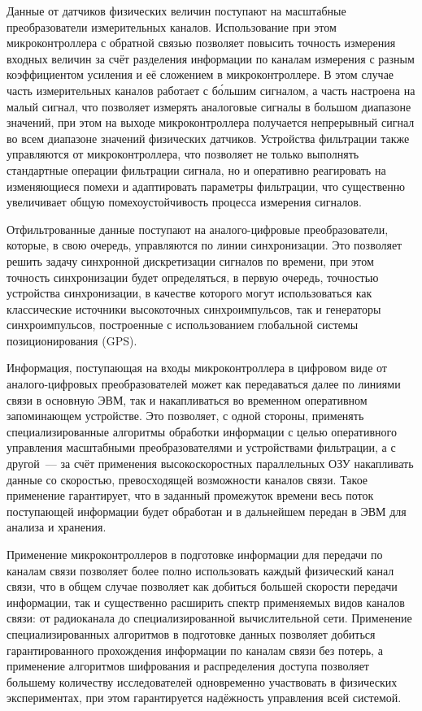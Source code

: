 \documentclass[a4paper, 14pt, titlepage]{extarticle}
\begin{document}
  Данные от датчиков физических величин поступают на масштабные преобразователи измерительных
  каналов. Использование при этом микроконтроллера с обратной связью позволяет повысить точность
  измерения входных величин за счёт разделения информации по каналам
  измерения с разным коэффициентом усиления и её сложением в микроконтроллере. В этом случае часть
  измерительных каналов работает с б\'{о}льшим сигналом, а часть настроена на малый сигнал, что
  позволяет измерять аналоговые сигналы в большом диапазоне значений, при этом на выходе
  микроконтроллера получается непрерывный сигнал во всем диапазоне значений физических датчиков.
  Устройства фильтрации также управляются от микроконтроллера, что позволяет не только выполнять
  стандартные операции фильтрации сигнала, но и оперативно реагировать на изменяющиеся помехи и адаптировать параметры
  фильтрации, что существенно увеличивает общую помехоустойчивость процесса измерения сигналов.

  Отфильтрованные данные поступают на аналого-цифровые преобразователи, которые, в свою очередь,
  управляются по линии синхронизации. Это позволяет решить задачу синхронной дискретизации сигналов
  по времени, при этом точность синхронизации будет определяться, в первую очередь, точностью
  устройства синхронизации, в качестве которого могут использоваться как классические источники
  высокоточных синхроимпульсов, так и генераторы синхроимпульсов, построенные с использованием
  глобальной системы позиционирования (GPS).

  Информация, поступающая на входы микроконтроллера в цифровом виде от аналого-цифровых
  преобразователей может как передаваться далее по линиями связи в основную ЭВМ, так и
  накапливаться во временном оперативном запоминающем устройстве. Это позволяет, с одной стороны,
  применять специализированные алгоритмы обработки информации с целью оперативного управления
  масштабными преобразователями и устройствами фильтрации, а с другой~--- за счёт применения
  высокоскоростных параллельных ОЗУ накапливать данные со скоростью, превосходящей возможности
  каналов связи. Такое применение гарантирует, что в заданный промежуток времени весь поток
  поступающей информации будет обработан и в дальнейшем передан в ЭВМ для анализа и хранения.

  Применение микроконтроллеров в подготовке информации для передачи по каналам связи позволяет
  более полно использовать каждый физический канал связи, что в общем случае позволяет как добиться
  большей скорости передачи информации, так и существенно расширить спектр применяемых видов каналов
  связи: от радиоканала до специализированной вычислительной сети. Применение специализированных
  алгоритмов в подготовке данных позволяет добиться гарантированного прохождения информации по
  каналам связи без потерь, а применение алгоритмов шифрования и распределения доступа позволяет
  большему количеству исследователей одновременно участвовать в физических экспериментах, при этом
  гарантируется надёжность управления всей системой.
\end{document}
